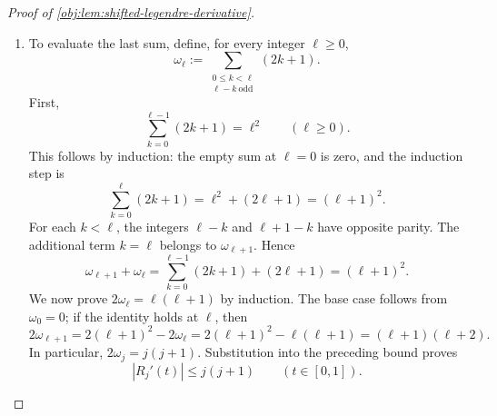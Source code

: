 \begin{proof}[Proof of \cref{obj:lem:shifted-legendre-derivative}]
\begin{enumerate}
\item To evaluate the last sum, define, for every integer \(\ell\ge0\),
\[
\omega_\ell:=
\sum_{\substack{0\le k<\ell\\\ell-k\ \mathrm{odd}}}(2k+1).
\]
First,
\[
\sum_{k=0}^{\ell-1}(2k+1)=\ell^2
\qquad(\ell\ge0).
\]
This follows by induction: the empty sum at \(\ell=0\) is zero, and the induction step is
\[
\sum_{k=0}^{\ell}(2k+1)
=\ell^2+(2\ell+1)=(\ell+1)^2.
\]
For each \(k<\ell\), the integers \(\ell-k\) and \(\ell+1-k\) have opposite parity. The additional term \(k=\ell\) belongs to \(\omega_{\ell+1}\). Hence
\[
\omega_{\ell+1}+\omega_\ell
=
\sum_{k=0}^{\ell-1}(2k+1)+(2\ell+1)
=(\ell+1)^2.
\]
We now prove \(2\omega_\ell=\ell(\ell+1)\) by induction. The base case follows from \(\omega_0=0\); if the identity holds at \(\ell\), then
\[
2\omega_{\ell+1}
=2(\ell+1)^2-2\omega_\ell
=2(\ell+1)^2-\ell(\ell+1)
=(\ell+1)(\ell+2).
\]
In particular, \(2\omega_j=j(j+1)\). Substitution into the preceding bound proves
\[
|R_j'(t)|\le j(j+1)
\qquad(t\in[0,1]).
\]
\end{enumerate}
\end{proof}
